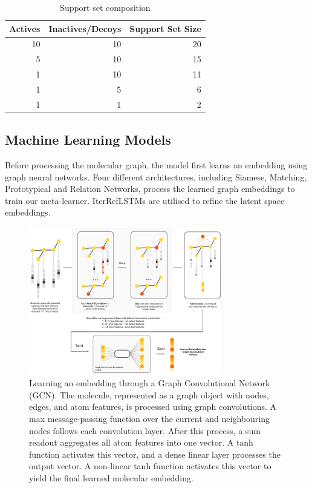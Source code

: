 \begin{table}
	\centering
	\begin{tabular}{@{}rrr@{}}
		\hline
		Actives & Inactives/Decoys & Support Set Size \\
		\hline
		10  & 10 & 20 \\
		5   & 10 & 15 \\
		1   & 10 & 11 \\
		1   & 5  & 6 \\
		1   & 1  & 2 \\
		\hline
	\end{tabular}
	\caption{Support set composition}
	\label{table:support-set-sizes}
\end{table}



\subsection{Machine Learning Models}

Before processing the molecular graph, the model first learns an embedding using graph neural networks. Four different architectures, including Siamese, Matching, Prototypical and Relation Networks, process the learned graph embeddings to train our meta-learner. IterRefLSTMs are utilised to refine the latent space embeddings. 

\begin{figure}[ht!]
	\centering
	\includegraphics[width=0.75\textwidth]{img/DVGCNArchi.png}
	\caption{Learning an embedding through a Graph Convolutional Network (GCN). The molecule, represented as a graph object with nodes, edges, and atom features, is processed using graph convolutions. A max message-passing function over the current and neighbouring nodes follows each convolution layer. After this process, a sum readout aggregates all atom features into one vector. A tanh function activates this vector, and a dense linear layer processes the output vector. A non-linear tanh function activates this vector to yield the final learned molecular embedding.}
	\label{fig:dvgcnarchi}
\end{figure}

